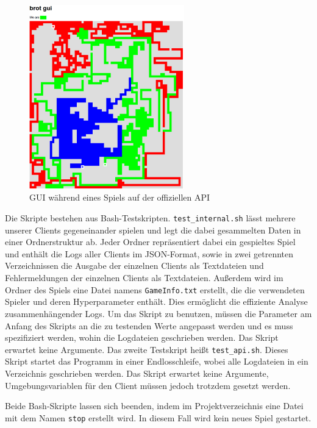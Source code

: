 \documentclass[12pt,a4paper]{article}
\begin{document}
\begin{figure}
    \centering
    \includegraphics[width=0.6\textwidth]{gui2.png}
    \caption{GUI während eines Spiels auf der offiziellen API}
    \label{fig:guiAPI}
\end{figure}

Die Skripte bestehen aus Bash-Testskripten.  \texttt{test\_internal.sh} lässt mehrere unserer Clients gegeneinander spielen und legt die dabei gesammelten Daten in einer Ordnerstruktur ab. Jeder Ordner repräsentiert dabei ein gespieltes Spiel und enthält die Logs aller Clients im JSON-Format, sowie in zwei getrennten Verzeichnissen die Ausgabe der einzelnen Clients als Textdateien und Fehlermeldungen der einzelnen Clients als Textdateien. Außerdem wird im Ordner des Spiels eine Datei namens \texttt{GameInfo.txt} erstellt, die die verwendeten Spieler und deren Hyperparameter enthält. Dies ermöglicht die effiziente Analyse zusammenhängender Logs. Um das Skript zu benutzen, müssen die Parameter am Anfang des Skripts an die zu testenden Werte angepasst werden und es muss spezifiziert werden, wohin die Logdateien geschrieben werden. Das Skript erwartet keine Argumente. Das zweite Testskript heißt \texttt{test\_api.sh}. Dieses Skript startet das Programm in einer Endlosschleife, wobei alle Logdateien in ein Verzeichnis geschrieben werden. Das Skript erwartet keine Argumente, Umgebungsvariablen für den Client müssen jedoch trotzdem gesetzt werden.

Beide Bash-Skripte lassen sich beenden, indem im Projektverzeichnis eine Datei mit dem Namen \texttt{stop} erstellt wird. In diesem Fall wird kein neues Spiel gestartet.
\end{document}
